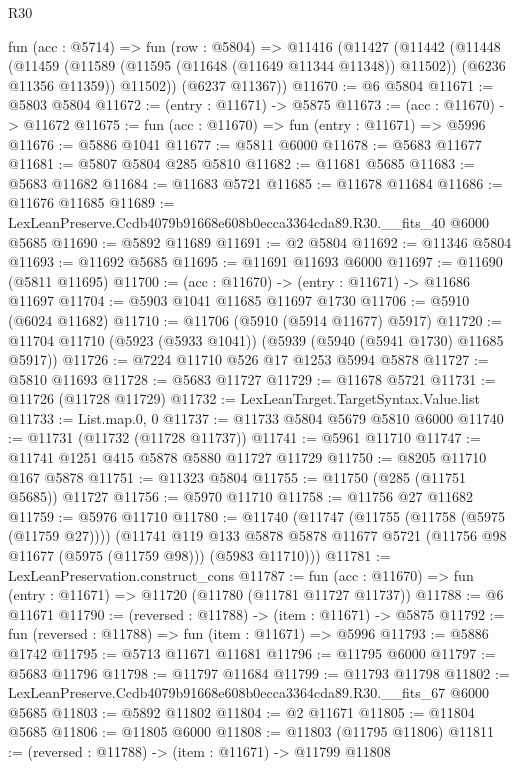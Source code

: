 \begin{lexlean}{R30}
\begin{coremodule}
  fun (acc : @5714) =>
  fun (row : @5804) =>
  @11416
    (@11427
      (@11442
        (@11448
          (@11459 (@11589 (@11595 (@11648 (@11649 @11344 @11348)) @11502)) (@6236 @11356 @11359))
          @11502))
      (@6237 @11367))
@11670 := @6 @5804
@11671 := @5803 @5804
@11672 := (entry : @11671) -> @5875
@11673 := (acc : @11670) -> @11672
@11675 := fun (acc : @11670) => fun (entry : @11671) => @5996
@11676 := @5886 @1041
@11677 := @5811 @6000
@11678 := @5683 @11677
@11681 := @5807 @5804 @285 @5810
@11682 := @11681 @5685
@11683 := @5683 @11682
@11684 := @11683 @5721
@11685 := @11678 @11684
@11686 := @11676 @11685
@11689 := LexLeanPreserve.Ccdb4079b91668e608b0ecca3364cda89.R30.__fits_40 @6000 @5685
@11690 := @5892 @11689
@11691 := @2 @5804
@11692 := @11346 @5804
@11693 := @11692 @5685
@11695 := @11691 @11693 @6000
@11697 := @11690 (@5811 @11695)
@11700 := (acc : @11670) -> (entry : @11671) -> @11686 @11697
@11704 := @5903 @1041 @11685 @11697 @1730
@11706 := @5910 (@6024 @11682)
@11710 := @11706 (@5910 (@5914 @11677) @5917)
@11720 := @11704 @11710 (@5923 (@5933 @1041)) (@5939 (@5940 (@5941 @1730) @11685 @5917))
@11726 := @7224 @11710 @526 @17 @1253 @5994 @5878
@11727 := @5810 @11693
@11728 := @5683 @11727
@11729 := @11678 @5721
@11731 := @11726 (@11728 @11729)
@11732 := LexLeanTarget.TargetSyntax.Value.list
@11733 := List.map.{0, 0}
@11737 := @11733 @5804 @5679 @5810 @6000
@11740 := @11731 (@11732 (@11728 @11737))
@11741 := @5961 @11710
@11747 := @11741 @1251 @415 @5878 @5880 @11727 @11729
@11750 := @8205 @11710 @167 @5878
@11751 := @11323 @5804
@11755 := @11750 (@285 (@11751 @5685)) @11727
@11756 := @5970 @11710
@11758 := @11756 @27 @11682
@11759 := @5976 @11710
@11780 := @11740
    (@11747
      (@11755 (@11758 (@5975 (@11759 @27))))
      (@11741
        @119
        @133
        @5878
        @5878
        @11677
        @5721
        (@11756 @98 @11677 (@5975 (@11759 @98)))
        (@5983 @11710)))
@11781 := LexLeanPreservation.construct_cons
@11787 := fun (acc : @11670) => fun (entry : @11671) => @11720 (@11780 (@11781 @11727 @11737))
@11788 := @6 @11671
@11790 := (reversed : @11788) -> (item : @11671) -> @5875
@11792 := fun (reversed : @11788) => fun (item : @11671) => @5996
@11793 := @5886 @1742
@11795 := @5713 @11671 @11681
@11796 := @11795 @6000
@11797 := @5683 @11796
@11798 := @11797 @11684
@11799 := @11793 @11798
@11802 := LexLeanPreserve.Ccdb4079b91668e608b0ecca3364cda89.R30.__fits_67 @6000 @5685
@11803 := @5892 @11802
@11804 := @2 @11671
@11805 := @11804 @5685
@11806 := @11805 @6000
@11808 := @11803 (@11795 @11806)
@11811 := (reversed : @11788) -> (item : @11671) -> @11799 @11808

\end{coremodule}
\end{lexlean}

